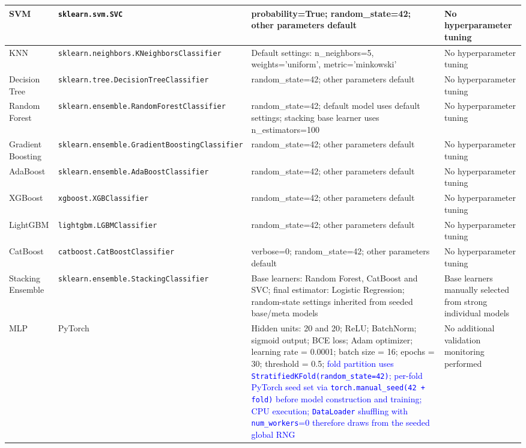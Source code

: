 \documentclass[a4paper,fleqn]{cas-sc}
\begin{document}
\begin{longtable}{p{2cm} p{7.75cm} p{3cm} p{2.25cm}}
SVM 
& \texttt{sklearn.svm.SVC} 
& probability=True; random\_state=42; other parameters default 
& No hyperparameter tuning \\ 
\midrule

KNN 
& \texttt{sklearn.neighbors.KNeighborsClassifier} 
& Default settings: n\_neighbors=5, weights='uniform', metric='minkowski' 
& No hyperparameter tuning \\ 
\midrule

Decision Tree 
& \texttt{sklearn.tree.DecisionTreeClassifier} 
& random\_state=42; other parameters default 
& No hyperparameter tuning \\ 
\midrule

Random Forest 
& \texttt{sklearn.ensemble.RandomForestClassifier} 
& random\_state=42; default model uses default settings; stacking base learner uses n\_estimators=100 
& No hyperparameter tuning \\ 
\midrule

Gradient Boosting 
& \texttt{sklearn.ensemble.GradientBoostingClassifier} 
& random\_state=42; other parameters default 
& No hyperparameter tuning \\ 
\midrule

AdaBoost 
& \texttt{sklearn.ensemble.AdaBoostClassifier} 
& random\_state=42; other parameters default 
& No hyperparameter tuning \\ 
\midrule

XGBoost 
& \texttt{xgboost.XGBClassifier} 
& random\_state=42; other parameters default 
& No hyperparameter tuning \\ 
\midrule

LightGBM 
& \texttt{lightgbm.LGBMClassifier} 
& random\_state=42; other parameters default 
& No hyperparameter tuning \\ 
\midrule

CatBoost 
& \texttt{catboost.CatBoostClassifier} 
& verbose=0; random\_state=42; other parameters default 
& No hyperparameter tuning \\ 
\midrule

Stacking Ensemble 
& \texttt{sklearn.ensemble.StackingClassifier} 
& Base learners: Random Forest, CatBoost and SVC; final estimator: Logistic Regression; random-state settings inherited from seeded base/meta models 
& Base learners manually selected from strong individual models \\ 
\midrule

MLP 
& PyTorch 
& Hidden units: 20 and 20; ReLU; BatchNorm; sigmoid output; BCE loss; Adam optimizer; learning rate = 0.0001; batch size = 16; epochs = 30; threshold = 0.5; \textcolor{blue}{fold partition uses \texttt{StratifiedKFold(random\_state=42)}; per-fold PyTorch seed set via \texttt{torch.manual\_seed(42 + fold)} before model construction and training; CPU execution; \texttt{DataLoader} shuffling with \texttt{num\_workers}=0 therefore draws from the seeded global RNG} 
& No additional validation monitoring performed \\ 
\midrule


\end{longtable}
\end{document}
